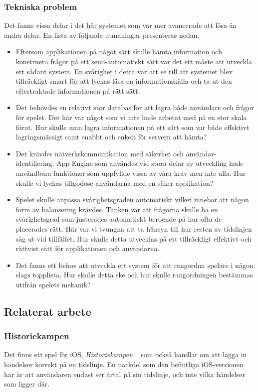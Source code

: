 \documentclass[a4paper, 11pt]{article}
\begin{document}
\subsubsection{Tekniska problem}
Det fanns vissa delar i det här systemet som var mer avancerade att lösa än andra delar. En lista av följande utmaningar presenteras nedan.
\begin{itemize}
\item Eftersom applikationen på något sätt skulle hämta information och konstruera frågor på ett semi-automatiskt sätt var det ett måste att utveckla ett sådant system. En svårighet i detta var att se till att systemet blev tillräckligt smart för att lyckas läsa en informationskälla och ta ut den eftertraktade informationen på rätt sätt.
\item Det behövdes en relativt stor databas för att lagra både användare och frågor för spelet. Det här var något som vi inte hade arbetat med på en stor skala förut. Hur skulle man lagra informationen på ett sätt som var både effektivt lagringsmässigt samt snabbt och enkelt för servern att hämta?
\item Det krävdes nätverkskommunikation med säkerhet och användar-
identifiering. App Engine som användes vid stora delar av utveckling hade användbara funktioner som uppfyllde vissa av våra krav men inte alla. Hur skulle vi lyckas tillgodose användarna med en säker applikation?
\item Spelet skulle anpassa svårighetsgraden automatiskt vilket innebar att någon form av balansering krävdes. Tanken var att frågorna skulle ha en svårighetsgrad som justerades automatiskt beroende på hur ofta de placerades rätt. Här var vi tvungna att ta hänsyn till hur resten av tidslinjen såg ut vid tillfället. Hur skulle detta utvecklas på ett tillräckligt effektivt och rättvist sätt för applikationen och användarna.
\item Det fanns ett behov att utveckla ett system för att rangordna spelare i någon slags topplista. Hur skulle detta ske och hur skulle rangordningen bestämmas utifrån spelets mekanik? 
\end{itemize}

\subsection{Relaterat arbete}

\subsubsection{Historiekampen} \label{Historiekampen}
Det finns ett spel för iOS, \textit{Historiekampen} ~\cite{historiekampen} som också handlar om att lägga in händelser korrekt på en tidslinje. En nackdel som den befintliga iOS-versionen har är att användaren endast ser årtal på sin tidslinje, och inte vilka händelser som ligger där.
\end{document}
